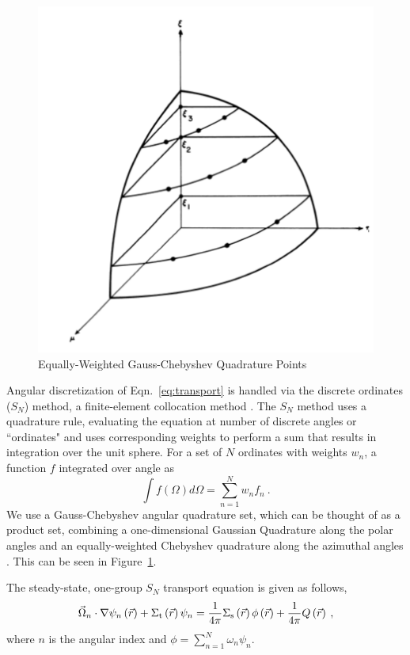 %
\begin{figure}[H]
    \centering
    \includegraphics[width=.5\textwidth]{fig/SNPoints.png}
    \caption{Equally-Weighted Gauss-Chebyshev Quadrature Points \cite{Lathrop1965}}
    \label{fig:SN}
\end{figure}
%
Angular discretization of Eqn.~\eqref{eq:transport} is handled via the discrete ordinates ($S_N$) method, a finite-element collocation method \cite{Lathrop1965}. The $S_N$ method uses a quadrature rule, evaluating the equation at number of discrete angles or ``ordinates" and uses corresponding weights to perform a sum that results in integration over the unit sphere. 
For a set of $N$ ordinates with weights $w_n$, a function $f$ integrated over angle as
%
\begin{equation}
\int f(\Omega) d\Omega = \sum\limits_{n=1}^{N} w_n f_n \:.  
\end{equation}
We use a Gauss-Chebyshev angular quadrature set, which can be thought of as a product set, combining a one-dimensional Gaussian Quadrature along the polar angles and an equally-weighted Chebyshev quadrature along the azimuthal angles \cite{jarrel-thesis}. This can be seen in Figure~\ref{fig:SN}. 

The steady-state, one-group $S_N$ transport equation is given as follows,
%
 \begin{equation}
  \vec{\Omega}_n \cdot \nabla \psi_n \left(\vec{r}\right)+ \Sigma_{\mathrm{t}}\left(\vec{r}\right)\psi_n = \frac{1}{4 \pi} \Sigma_{\mathrm{s}}\left(\vec{r}\right) \phi\left(\vec{r}\right) + \frac{1}{4 \pi} Q\left(\vec{r}\right)\:,
  \label{eq:transport-angular}
 \end{equation}
where $n$ is the angular index and $\phi = \sum\limits_{n=1}^N \omega_n \psi_n$.

